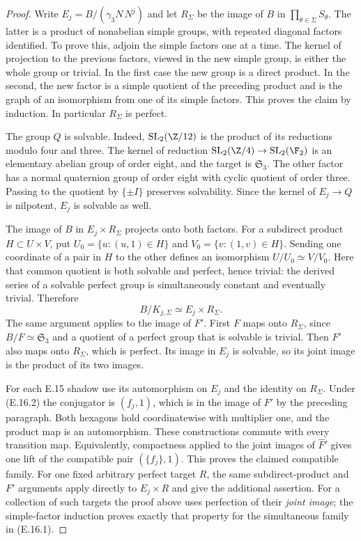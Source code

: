 \begin{proof}
Write $E_j=B/(\gamma_3N\,N^j)$ and let $R_\Sigma$ be the
image of $B$ in $\prod_{\theta\in\Sigma}S_\theta$.
The latter is a product of nonabelian simple groups,
with repeated diagonal factors identified. To prove this,
adjoin the simple factors one at a time. The kernel of
projection to the previous factors, viewed in the new
simple group, is either the whole group or trivial.
In the first case the new group is a direct product.
In the second, the new factor is a simple quotient of
the preceding product and is the graph of an isomorphism
from one of its simple factors. This proves the claim
by induction. In particular $R_\Sigma$ is perfect.

The group $Q$ is solvable. Indeed,
$\mathrm{SL}_2(\Z/12)$ is the product of its reductions
modulo four and three. The kernel of reduction
$\mathrm{SL}_2(\Z/4)\to\mathrm{SL}_2(\F_2)$ is an
elementary abelian group of order eight, and the target
is $\mathfrak S_3$. The other factor has a normal
quaternion group of order eight with cyclic quotient
of order three. Passing to the quotient by $\{\pm I\}$
preserves solvability. Since the kernel of $E_j\to Q$
is nilpotent, $E_j$ is solvable as well.

The image of $B$ in $E_j\times R_\Sigma$ projects
onto both factors. For a subdirect product $H\subset U\times V$,
put $U_0=\{u:(u,1)\in H\}$ and
$V_0=\{v:(1,v)\in H\}$. Sending one coordinate of a
pair in $H$ to the other defines an isomorphism
$U/U_0\simeq V/V_0$. Here that common quotient is
both solvable and perfect, hence trivial: the derived
series of a solvable perfect group is simultaneously
constant and eventually trivial. Therefore
\[
                    B/K_{j,\Sigma}\simeq E_j\times R_\Sigma.
 \tag{E.16.2}
\]
The same argument applies to the image of $F'$.
First $F$ maps onto $R_\Sigma$, since $B/F\simeq
\mathfrak S_3$ and a quotient of a perfect group that
is solvable is trivial. Then $F'$ also maps onto
$R_\Sigma$, which is perfect. Its image in $E_j$ is
solvable, so its joint image is the product of its two
images.

For each E.15 shadow use its automorphism on $E_j$
and the identity on $R_\Sigma$. Under (E.16.2) the
conjugator is $(f_j,1)$, which is in the image of
$F'$ by the preceding paragraph. Both hexagons hold
coordinatewise with multiplier one, and the product
map is an automorphism. These constructions commute
with every transition map. Equivalently, compactness
applied to the joint images of $\widehat F'$ gives
one lift of the compatible pair $(\{f_j\},1)$.
This proves the claimed compatible family.
For one fixed arbitrary perfect target $R$, the same
subdirect-product and $F'$ arguments apply directly
to $E_j\times R$ and give the additional assertion.
For a collection of such targets the proof above
uses perfection of their \emph{joint image}; the
simple-factor induction proves exactly that property
for the simultaneous family in (E.16.1).


\end{proof}
